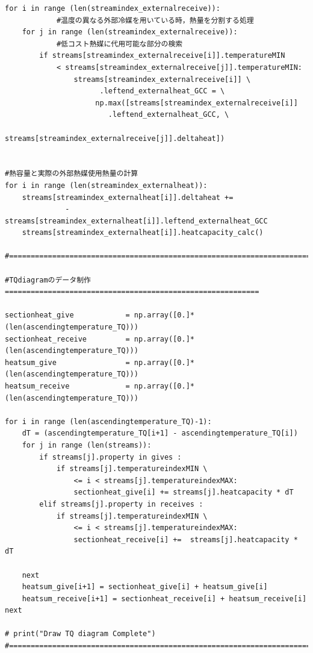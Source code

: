 \documentclass[a4j]{jsreport}
\begin{document}
\begin{lstlisting}[caption=グランドコンポジットカーブおよびTQ線図を書くコード]
for i in range (len(streamindex_externalreceive)):
            #温度の異なる外部冷媒を用いている時，熱量を分割する処理
    for j in range (len(streamindex_externalreceive)):
            #低コスト熱媒に代用可能な部分の検索
        if streams[streamindex_externalreceive[i]].temperatureMIN
            < streams[streamindex_externalreceive[j]].temperatureMIN:
                streams[streamindex_externalreceive[i]] \
                      .leftend_externalheat_GCC = \
                     np.max([streams[streamindex_externalreceive[i]]
                        .leftend_externalheat_GCC, \
                          streams[streamindex_externalreceive[j]].deltaheat])


#熱容量と実際の外部熱媒使用熱量の計算
for i in range (len(streamindex_externalheat)):
    streams[streamindex_externalheat[i]].deltaheat +=
              - streams[streamindex_externalheat[i]].leftend_externalheat_GCC
    streams[streamindex_externalheat[i]].heatcapacity_calc()

#==============================================================================

#TQdiagramのデータ制作===========================================================

sectionheat_give            = np.array([0.]*(len(ascendingtemperature_TQ)))
sectionheat_receive         = np.array([0.]*(len(ascendingtemperature_TQ)))
heatsum_give                = np.array([0.]*(len(ascendingtemperature_TQ)))
heatsum_receive             = np.array([0.]*(len(ascendingtemperature_TQ)))

for i in range (len(ascendingtemperature_TQ)-1):
    dT = (ascendingtemperature_TQ[i+1] - ascendingtemperature_TQ[i])
    for j in range (len(streams)):
        if streams[j].property in gives :
            if streams[j].temperatureindexMIN \
                <= i < streams[j].temperatureindexMAX:
                sectionheat_give[i] += streams[j].heatcapacity * dT
        elif streams[j].property in receives :
            if streams[j].temperatureindexMIN \
                <= i < streams[j].temperatureindexMAX:
                sectionheat_receive[i] +=  streams[j].heatcapacity * dT

    next
    heatsum_give[i+1] = sectionheat_give[i] + heatsum_give[i]
    heatsum_receive[i+1] = sectionheat_receive[i] + heatsum_receive[i]
next

# print("Draw TQ diagram Complete")
#=========================================================================


\end{lstlisting}
\end{document}
